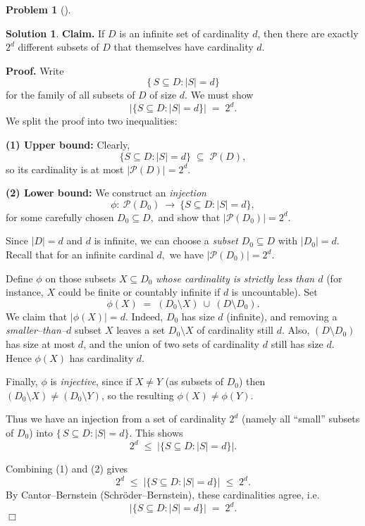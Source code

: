 \documentclass[12pt]{article}
\theoremstyle{definition} %
\newtheorem{solution}{Solution}
\newtheorem{problem}{Problem}
\theoremstyle{plain} %
\begin{document}
\begin{problem}[]
    
\end{problem}
\begin{solution}
    \textbf{Claim.}\; If $D$ is an infinite set of cardinality $d$, then there are exactly $2^{d}$ 
    different subsets of $D$ that themselves have cardinality $d.$
    
    \medskip
    
    \noindent
    \textbf{Proof.}\; Write
    \[
    \bigl\{\,S\subseteq D : |S|=d\bigr\}
    \]
    for the family of all subsets of $D$ of size $d.$  We must show 
    \[
    \left|\bigl\{S\subseteq D : |S|=d\bigr\}\right| \;=\; 2^{d}.
    \]
    We split the proof into two inequalities:
    
    \medskip
    
    \noindent
    \textbf{(1) Upper bound: } 
    Clearly,
    \[
    \bigl\{S\subseteq D : |S|=d\bigr\} \;\subseteq\;\mathcal{P}(D),
    \]
    so its cardinality is at most $|\mathcal{P}(D)| = 2^{d}.$
    
    \medskip
    
    \noindent
    \textbf{(2) Lower bound: } 
    We construct an \emph{injection}
    \[
    \phi:\ \mathcal{P}(D_0)\ \longrightarrow\ \bigl\{S \subseteq D : |S|=d \bigr\},
    \]
    for some carefully chosen $D_0\subseteq D,$ and show that 
    $|\mathcal{P}(D_0)|=2^{d}.$
    
    Since $|D|=d$ and $d$ is infinite, we can choose a \emph{subset} 
    $D_0\subseteq D$ with $|D_0|=d.$  
    Recall that for an infinite cardinal $d,$ we have 
    $|\mathcal{P}(D_0)| = 2^{d}.$  
    
    Define $\phi$ on those subsets $X\subseteq D_0$ \emph{whose cardinality is \textup{strictly less} 
    than $d$} (for instance, $X$ could be finite or countably infinite if $d$ is uncountable).  
    Set
    \[
    \phi(X)\;=\;(D_0 \setminus X)\ \cup\ (D\setminus D_0).
    \]
    We claim that $|\phi(X)|=d$.  
    Indeed, $D_0$ has size $d$ (infinite), and removing a \emph{smaller--than--$d$} subset $X$ 
    leaves a set $D_0\setminus X$ of cardinality still $d$.  
    Also, $(D\setminus D_0)$ has size at most $d$, and the union of two sets of cardinality $d$ 
    still has size $d$.  
    Hence $\phi(X)$ has cardinality $d.$  
    
    Finally, $\phi$ is \emph{injective}, since if $X\neq Y$ (as subsets of $D_0$) 
    then $(D_0\setminus X)\neq(D_0\setminus Y)$, so the resulting $\phi(X)\neq\phi(Y).$
    
    Thus we have an injection from a set of cardinality $2^{d}$ (namely all ``small'' subsets of $D_0$) 
    into $\{\,S\subseteq D : |S|=d\}$.  
    This shows 
    \[
    2^{d}\;\le\;\bigl|\{S\subseteq D : |S|=d\}\bigr|.
    \]
    
    \medskip
    
    \noindent
    Combining (1) and (2) gives
    \[
    2^{d}\;\le\;\bigl|\{S\subseteq D : |S|=d\}\bigr|\;\le\;2^{d}.
    \]
    By Cantor--Bernstein (Schr\"oder--Bernstein), these cardinalities agree, i.e.
    \[
    \bigl|\{S\subseteq D : |S|=d\}\bigr|\;=\;2^{d}.
    \]
    \quad $\Box$ 
\end{solution}
\end{document}
